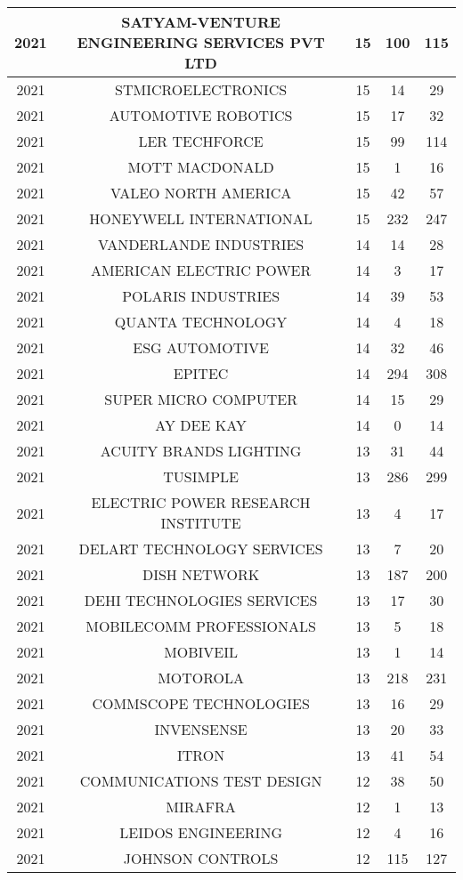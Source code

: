 \documentclass{article}%
\begin{document}
\begin{longtable}{c|c|c|c|c}
\hline%
2021&SATYAM{-}VENTURE ENGINEERING SERVICES PVT LTD&15&100&115\\%
\hline%
2021&STMICROELECTRONICS&15&14&29\\%
\hline%
2021&AUTOMOTIVE ROBOTICS&15&17&32\\%
\hline%
2021&LER TECHFORCE&15&99&114\\%
\hline%
2021&MOTT MACDONALD&15&1&16\\%
\hline%
2021&VALEO NORTH AMERICA&15&42&57\\%
\hline%
2021&HONEYWELL INTERNATIONAL&15&232&247\\%
\hline%
2021&VANDERLANDE INDUSTRIES&14&14&28\\%
\hline%
2021&AMERICAN ELECTRIC POWER&14&3&17\\%
\hline%
2021&POLARIS INDUSTRIES&14&39&53\\%
\hline%
2021&QUANTA TECHNOLOGY&14&4&18\\%
\hline%
2021&ESG AUTOMOTIVE&14&32&46\\%
\hline%
2021&EPITEC&14&294&308\\%
\hline%
2021&SUPER MICRO COMPUTER&14&15&29\\%
\hline%
2021&AY DEE KAY&14&0&14\\%
\hline%
2021&ACUITY BRANDS LIGHTING&13&31&44\\%
\hline%
2021&TUSIMPLE&13&286&299\\%
\hline%
2021&ELECTRIC POWER RESEARCH INSTITUTE&13&4&17\\%
\hline%
2021&DELART TECHNOLOGY SERVICES&13&7&20\\%
\hline%
2021&DISH NETWORK&13&187&200\\%
\hline%
2021&DEHI TECHNOLOGIES SERVICES&13&17&30\\%
\hline%
2021&MOBILECOMM PROFESSIONALS&13&5&18\\%
\hline%
2021&MOBIVEIL&13&1&14\\%
\hline%
2021&MOTOROLA&13&218&231\\%
\hline%
2021&COMMSCOPE TECHNOLOGIES&13&16&29\\%
\hline%
2021&INVENSENSE&13&20&33\\%
\hline%
2021&ITRON&13&41&54\\%
\hline%
2021&COMMUNICATIONS TEST DESIGN&12&38&50\\%
\hline%
2021&MIRAFRA&12&1&13\\%
\hline%
2021&LEIDOS ENGINEERING&12&4&16\\%
\hline%
2021&JOHNSON CONTROLS&12&115&127\\%

\end{longtable}
\end{document}
